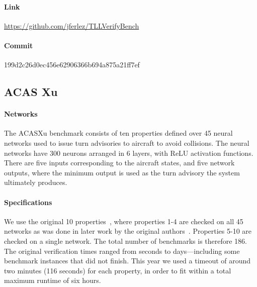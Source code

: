 \documentclass[oneside,11pt,dvipsnames]{book}
\begin{document}
\paragraph*{Link} \url{https://github.com/jferlez/TLLVerifyBench}
\paragraph*{Commit}
199d2c26d0ec456e62906366b694a875a21ff7ef


\subsection{ACAS Xu}
\paragraph{Networks} The ACASXu benchmark consists of ten properties defined over 45 neural networks used to issue turn advisories to aircraft to avoid collisions. The neural networks have 300 neurons arranged in 6 layers, with ReLU activation functions. There are five inputs corresponding to the aircraft states, and five network outputs, where the minimum output is used as the turn advisory the system ultimately produces.

\paragraph{Specifications} We use the original 10 properties~\cite{katz2017reluplex}, where properties 1-4 are checked on all 45 networks as was done in later work by the original authors~\cite{katz2019marabou}. Properties 5-10 are checked on a single network. The total number of benchmarks is therefore 186. The original verification times ranged from seconds to days---including some benchmark instances that did not finish. This year we used a timeout of around two minutes (116 seconds) for each property, in order to fit within a total maximum runtime of six hours.


\end{document}
